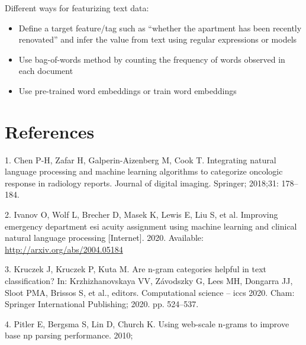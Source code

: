 \documentclass[10pt,letterpaper]{article}
\providecommand{\tightlist}{%
  \setlength{\itemsep}{0pt}\setlength{\parskip}{0pt}}
\begin{document}
Different ways for featurizing text data:

\begin{itemize}
\tightlist
\item
  Define a target feature/tag such as ``whether the apartment has been
  recently renovated'' and infer the value from text using regular
  expressions or models
\item
  Use bag-of-words method by counting the frequency of words observed in
  each document
\item
  Use pre-trained word embeddings or train word embeddings
\end{itemize}

\hypertarget{references}{%
\section*{References}\label{references}}

\hypertarget{refs}{}
\leavevmode\hypertarget{ref-chen2018integrating}{}%
1. Chen P-H, Zafar H, Galperin-Aizenberg M, Cook T. Integrating natural
language processing and machine learning algorithms to categorize
oncologic response in radiology reports. Journal of digital imaging.
Springer; 2018;31: 178--184.

\leavevmode\hypertarget{ref-ivanov2020improving}{}%
2. Ivanov O, Wolf L, Brecher D, Masek K, Lewis E, Liu S, et al.
Improving emergency department esi acuity assignment using machine
learning and clinical natural language processing {[}Internet{]}. 2020.
Available: \url{http://arxiv.org/abs/2004.05184}

\leavevmode\hypertarget{ref-kruczekngrams}{}%
3. Kruczek J, Kruczek P, Kuta M. Are n-gram categories helpful in text
classification? In: Krzhizhanovskaya VV, Závodszky G, Lees MH, Dongarra
JJ, Sloot PMA, Brissos S, et al., editors. Computational science -- iccs
2020. Cham: Springer International Publishing; 2020. pp. 524--537.

\leavevmode\hypertarget{ref-pitler2010using}{}%
4. Pitler E, Bergsma S, Lin D, Church K. Using web-scale n-grams to
improve base np parsing performance. 2010;

\nolinenumbers
\end{document}
